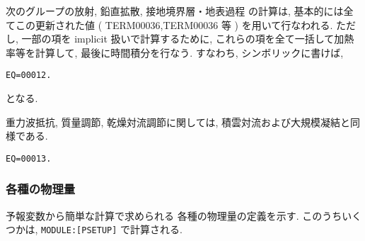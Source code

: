 次のグループの放射, 鉛直拡散, 接地境界層・地表過程
の計算は, 基本的には全てこの更新された値
( TERM00036,TERM00036 等 )
を用いて行なわれる.
ただし, 一部の項を implicit 扱いで計算するために,
これらの項を全て一括して加熱率等を計算して, 
最後に時間積分を行なう.
すなわち, シンボリックに書けば,
\begin{verbatim}
EQ=00012.
\end{verbatim}
となる.

重力波抵抗, 質量調節, 乾燥対流調節に関しては,
積雲対流および大規模凝結と同様である.
\begin{verbatim}
EQ=00013.
\end{verbatim}



\subsubsection{各種の物理量}

予報変数から簡単な計算で求められる
各種の物理量の定義を示す.
このうちいくつかは, 
\texttt{MODULE:[PSETUP]} で計算される.

